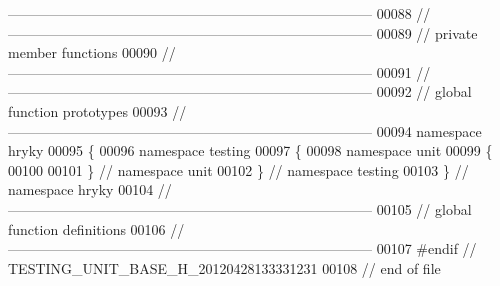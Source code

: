 \begin{DoxyCode}
{      ------------------------------------------------------------------------------}
00088 \textcolor{comment}{//
      ------------------------------------------------------------------------------}
00089 \textcolor{comment}{// private member functions}
00090 \textcolor{comment}{//
      ------------------------------------------------------------------------------}
00091 \textcolor{comment}{//
      ------------------------------------------------------------------------------}
00092 \textcolor{comment}{// global function prototypes}
00093 \textcolor{comment}{//
      ------------------------------------------------------------------------------}
00094 \textcolor{keyword}{namespace }hryky
00095 \{
00096 \textcolor{keyword}{namespace }testing
00097 \{
00098 \textcolor{keyword}{namespace }unit
00099 \{
00100 
00101 \} \textcolor{comment}{// namespace unit}
00102 \} \textcolor{comment}{// namespace testing}
00103 \} \textcolor{comment}{// namespace hryky}
00104 \textcolor{comment}{//
      ------------------------------------------------------------------------------}
00105 \textcolor{comment}{// global function definitions}
00106 \textcolor{comment}{//
      ------------------------------------------------------------------------------}
00107 \textcolor{preprocessor}{#endif // TESTING\_UNIT\_BASE\_H\_20120428133331231}
00108 \textcolor{preprocessor}{}\textcolor{comment}{// end of file}
\end{DoxyCode}
